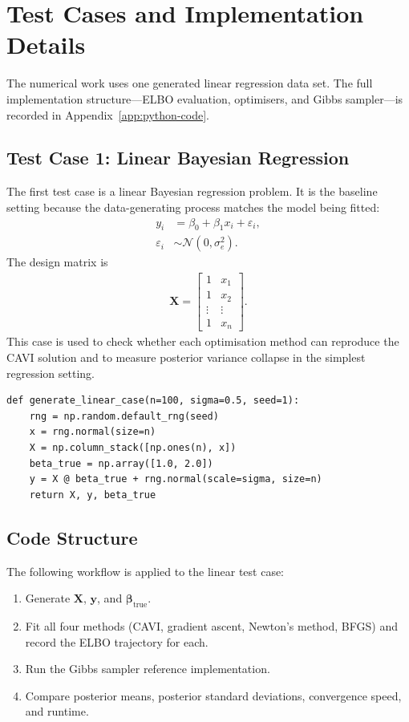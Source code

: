\documentclass[11pt,a4paper]{article}
\newcommand{\N}{\mathcal{N}}
\begin{document}
\section{Test Cases and Implementation Details}
\label{sec:implementation-details}

The numerical work uses one generated linear regression data set. The full implementation structure---ELBO evaluation, optimisers, and Gibbs sampler---is recorded in Appendix~\ref{app:python-code}.

\subsection{Test Case 1: Linear Bayesian Regression}

The first test case is a linear Bayesian regression problem. It is the baseline setting because the data-generating process matches the model being fitted:
\begin{align}
y_i &= \beta_0 + \beta_1 x_i + \varepsilon_i,\\
\varepsilon_i &\sim \N(0,\sigma_e^2).
\end{align}
The design matrix is
\begin{align}
\bm{X} =
\begin{bmatrix}
1 & x_1\\
1 & x_2\\
\vdots & \vdots\\
1 & x_n
\end{bmatrix}.
\end{align}
This case is used to check whether each optimisation method can reproduce the CAVI solution and to measure posterior variance collapse in the simplest regression setting.

\begin{verbatim}
def generate_linear_case(n=100, sigma=0.5, seed=1):
    rng = np.random.default_rng(seed)
    x = rng.normal(size=n)
    X = np.column_stack([np.ones(n), x])
    beta_true = np.array([1.0, 2.0])
    y = X @ beta_true + rng.normal(scale=sigma, size=n)
    return X, y, beta_true
\end{verbatim}

\subsection{Code Structure}

The following workflow is applied to the linear test case:
\begin{enumerate}
\item Generate $\bm{X}$, $\bm{y}$, and $\bm{\beta}_{\mathrm{true}}$.
\item Fit all four methods (CAVI, gradient ascent, Newton's method, BFGS) and record the ELBO trajectory for each.
\item Run the Gibbs sampler reference implementation.
\item Compare posterior means, posterior standard deviations, convergence speed, and runtime.
\end{enumerate}
\end{document}
